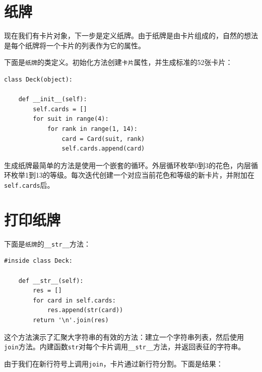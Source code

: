 \section{纸牌}

现在我们有卡片对象，下一步是定义纸牌。由于纸牌是由卡片组成的，自然的想法是每个纸牌将一个卡片的列表作为它的属性。


下面是{\tt 纸牌}的类定义。初始化方法创建{\tt 卡片}属性，并生成标准的52张卡片：



\beforeverb
\begin{verbatim}
class Deck(object):

    def __init__(self):
        self.cards = []
        for suit in range(4):
            for rank in range(1, 14):
                card = Card(suit, rank)
                self.cards.append(card)
\end{verbatim}
\afterverb
%
生成纸牌最简单的方法是使用一个嵌套的循环。外层循环枚举0到3的花色，内层循环枚举1到13的等级。每次迭代创建一个对应当前花色和等级的新卡片，并附加在{\tt self.cards}后。



\section{打印纸牌}
\label{打印纸牌}


下面是{\tt 纸牌}的\verb"__str__"方法：

\beforeverb
\begin{verbatim}
#inside class Deck:

    def __str__(self):
        res = []
        for card in self.cards:
            res.append(str(card))
        return '\n'.join(res)
\end{verbatim}
\afterverb
%
这个方法演示了汇聚大字符串的有效的方法：建立一个字符串列表，然后使用{\tt join}方法。内建函数{\tt str}对每个卡片调用\verb"__str__"方法，并返回表征的字符串。


由于我们在新行符号上调用{\tt join}，卡片通过新行符分割。下面是结果：

